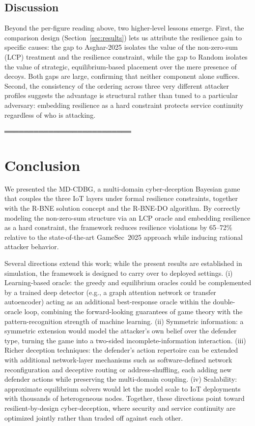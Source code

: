 \documentclass[conference]{IEEEtran}
\begin{document}
\subsection{Discussion}

Beyond the per-figure reading above, two higher-level lessons emerge. First, the
comparison design (Section~\ref{sec:results}) lets us attribute the resilience
gain to specific causes: the gap to Asghar-2025 isolates the value of the
non-zero-sum (LCP) treatment and the resilience constraint, while the gap to
Random isolates the value of strategic, equilibrium-based placement over the
mere presence of decoys. Both gaps are large, confirming that neither component
alone suffices. Second, the consistency of the ordering across three very
different attacker profiles suggests the advantage is structural rather than
tuned to a particular adversary: embedding resilience as a hard constraint
protects service continuity regardless of who is attacking.

══════════════════════════
\section{Conclusion}
\label{sec:conclusion}

We presented the MD-CDBG, a multi-domain cyber-deception Bayesian game that
couples the three IoT layers under formal resilience constraints, together with
the R-BNE solution concept and the R-BNE-DO algorithm. By correctly modeling the
non-zero-sum structure via an LCP oracle and embedding resilience as a hard
constraint, the framework reduces resilience violations by 65--72\% relative to
the state-of-the-art GameSec~2025 approach while inducing rational attacker
behavior.

Several directions extend this work; while the present results are established
in simulation, the framework is designed to carry over to deployed settings. (i) Learning-based oracle: the
greedy and equilibrium oracles could be complemented by a trained deep detector
(e.g., a graph attention network or transfer autoencoder) acting as an
additional best-response oracle within the double-oracle loop, combining the
forward-looking guarantees of game theory with the pattern-recognition strength
of machine learning. (ii) Symmetric information: a symmetric extension
would model the attacker's own belief over the defender
type, turning the game into a two-sided incomplete-information interaction.
(iii) Richer deception techniques: the defender's action repertoire can be
extended with additional network-layer mechanisms such as software-defined
network reconfiguration and deceptive routing or address-shuffling, each adding
new defender actions while preserving the multi-domain coupling. (iv) Scalability: approximate equilibrium solvers
would let the model scale to IoT deployments with thousands of heterogeneous
nodes. Together, these directions point toward resilient-by-design
cyber-deception, where security and service continuity are optimized jointly
rather than traded off against each other.
\end{document}
